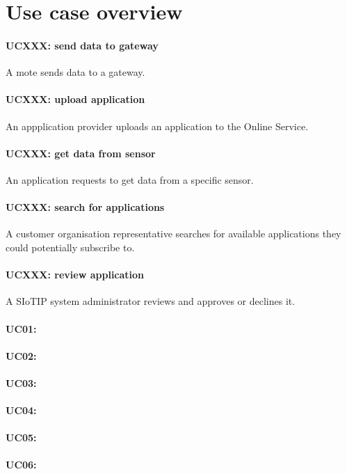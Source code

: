 \section{Use case overview}\label{sec:uc_overview}

\paragraph{UCXXX: send data to gateway}
A mote sends data to a gateway.
\paragraph{UCXXX: upload application}
An appplication provider uploads an application to the Online Service.
\paragraph{UCXXX: get data from sensor}
An application requests to get data from a specific sensor.
\paragraph{UCXXX: search for applications}
A customer organisation representative searches for available applications they
could potentially subscribe to.
\paragraph{UCXXX: review application}
A SIoTIP system administrator reviews and approves or declines it.
\paragraph{UC01: }
\paragraph{UC02: }
\paragraph{UC03: }
\paragraph{UC04: }
\paragraph{UC05: }
\paragraph{UC06: }
